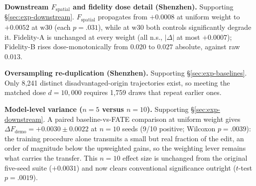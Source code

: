 \textbf{Downstream $F_{\mathrm{spatial}}$ and fidelity dose detail (Shenzhen).}
Supporting \S\ref{sec:exp-downstream}. $F_{\mathrm{spatial}}$ propagates from
$+0.0008$ at uniform weight to $+0.0052$ at w30 (each $p = .031$), while at w30
both controls significantly degrade it. Fidelity-A is unchanged at every weight
(all n.s., $|\Delta|$ at most $+0.0007$); Fidelity-B rises dose-monotonically
from $0.020$ to $0.027$ absolute, against raw $0.013$.

\textbf{Oversampling re-duplication (Shenzhen).} Supporting
\S\ref{sec:exp-baselines}. Only 8{,}241 distinct disadvantaged-origin
trajectories exist, so meeting the matched dose $d = 10{,}000$ requires
1{,}759 draws that repeat earlier ones.

\textbf{Model-level variance ($n = 5$ versus $n = 10$).} Supporting
\S\ref{sec:exp-downstream}. A paired baseline-vs-FATE comparison at uniform
weight gives $\Delta F_{\mathrm{demo}} = +0.0030 \pm 0.0022$ at $n = 10$
seeds (9/10 positive; Wilcoxon $p = .0039$): the training procedure alone
transmits a small but real fraction of the edit, an order of magnitude below
the upweighted gains, so the weighting lever remains what carries the
transfer. This $n = 10$ effect size is unchanged from the original five-seed
suite ($+0.0031$) and now clears conventional significance outright
($t$-test $p = .0019$).

